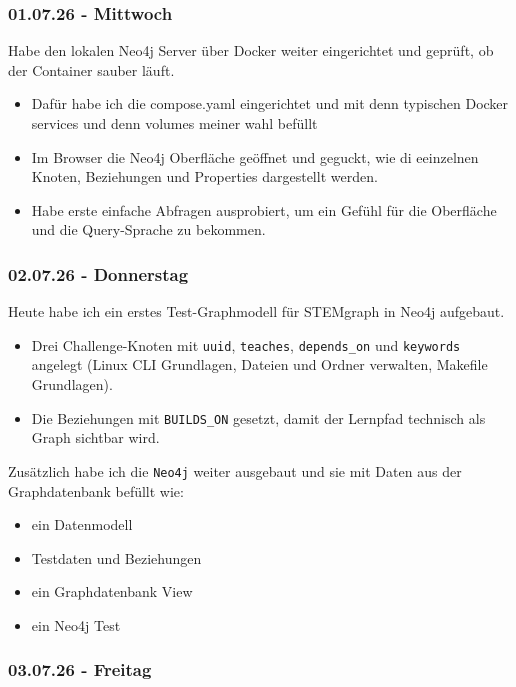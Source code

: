 \subsubsection{01.07.26 - Mittwoch}

Habe den lokalen Neo4j Server über Docker weiter eingerichtet und geprüft, ob der Container sauber läuft. 

\begin{itemize}
  \item Dafür habe ich die compose.yaml eingerichtet und mit denn typischen Docker services und denn volumes meiner wahl befüllt
  \item Im Browser die Neo4j Oberfläche geöffnet und geguckt, wie di eeinzelnen Knoten, Beziehungen und Properties dargestellt werden. 
  \item Habe erste einfache Abfragen ausprobiert, um ein Gefühl für die Oberfläche und die Query-Sprache zu bekommen.
\end{itemize}

\subsubsection{02.07.26 - Donnerstag}

Heute habe ich ein erstes Test-Graphmodell für STEMgraph in Neo4j aufgebaut. 

\begin{itemize}
  \item Drei Challenge-Knoten mit \texttt{uuid}, \texttt{teaches}, \texttt{depends\_on} und \texttt{keywords} angelegt (Linux CLI Grundlagen, Dateien und Ordner verwalten, Makefile Grundlagen). 
  \item Die Beziehungen mit \texttt{BUILDS\_ON} gesetzt, damit der Lernpfad technisch als Graph sichtbar wird.
\end{itemize}

Zusätzlich habe ich die \texttt{Neo4j} weiter ausgebaut und sie mit Daten aus der Graphdatenbank befüllt wie:

\begin{itemize}
  \item ein Datenmodell
  \item Testdaten und Beziehungen
  \item ein Graphdatenbank View
  \item ein Neo4j Test
\end{itemize}

\subsubsection{03.07.26 - Freitag}

